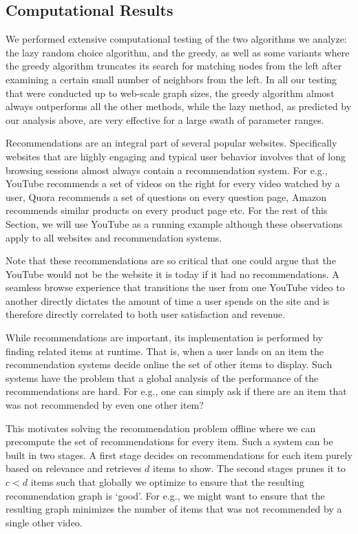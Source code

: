 \subsection{Computational Results}
We performed extensive computational testing of the two algorithms we analyze:
the lazy random choice algorithm, and the greedy, as well as some variants where
the greedy algorithm truncates its search for matching nodes from the left after
examining a certain small number of neighbors from the left. In all our testing
that were conducted up to web-scale graph sizes, the greedy algorithm almost
always outperforms all the other methods, while the lazy method, as predicted by
our analysis above, are very effective for a large swath of parameter ranges. 


\iffalse

Recommendations are an integral part of several popular websites. Specifically
websites that are highly engaging and typical user behavior involves that
of long browsing sessions almost always contain a recommendation system. For
e.g., YouTube recommends a set of videos on the right for every video watched
by a user, Quora recommends a set of questions on every question page, Amazon
recommends similar products on every product page etc. For the rest of this
Section, we will use YouTube as a running example although these observations
apply to all websites and recommendation systems. \vs

Note that these recommendations are so critical that one could argue that the
YouTube would not be the website it is today if it had no recommendations. A
seamless browse experience that transitions the user from one YouTube video to
another directly dictates the amount of time a user spends on the site and is
therefore directly correlated to both user satisfaction and revenue. \vs

While recommendations are important, its implementation is performed by finding
related items at runtime. That is, when a user lands on an item the
recommendation systems decide online the set of other items to display. Such
systems have the problem that a global analysis of the performance of the
recommendations are hard. For e.g., one can simply ask if there are an item that
was not recommended by even one other item? \vs

This motivates solving the recommendation problem offline where we can
precompute the set of recommendations for every item. Such a system can be built
in two stages. A first stage decides on recommendations for each item purely
based on relevance and retrieves $d$ items to show. The second stages prunes it
to $c < d$ items such that globally we optimize to ensure that the resulting
recommendation graph is `good'. For e.g., we might want to ensure that the
resulting graph minimizes the number of items that was not recommended by a
single other video. \vs


